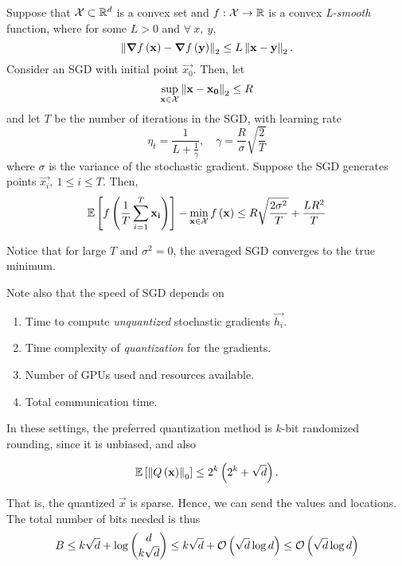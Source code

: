 \documentclass[twoside]{article}
\begin{document}
\begin{theorem}
    \label{thm:avg-sgd}
    Suppose that \(\mathcal X\subset\mathbb R^d\) is a convex set and \(f:\mathcal X\rightarrow\mathbb R\) is a 
    convex \emph{L-smooth} function, where for some \(L > 0\) and \(\forall\ x,\ y\),
    \begin{equation}
        \left\lVert\boldsymbol{\mathbf{\nabla}}f\left(\boldsymbol{\mathbf{x}}\right)-\boldsymbol{\mathbf{\nabla}}f\left(\boldsymbol{\mathbf{y}}\right)\right\rVert_2 \le L\left\lVert\boldsymbol{\mathbf{x}}-\boldsymbol{\mathbf{y}}\right\rVert_2.
        \label{eq:L-smooth}
    \end{equation}
    Consider an SGD with initial point \(\vec{x_0}\). Then, let
    \begin{equation}
        \sup_{\boldsymbol{\mathbf{x}}\in\mathcal X}\left\lVert\boldsymbol{\mathbf{x}}-\boldsymbol{\mathbf{x_0}}\right\rVert_2 \le R
    \end{equation}
    and let \(T\) be the number of iterations in the SGD, with learning rate
    \begin{equation}
        \eta_t = \frac{1}{L + \frac{1}{\gamma}},\quad \gamma = \frac{R}{\sigma}\sqrt{\frac{2}{T}}
    \end{equation}
    where \(\sigma\) is the variance of the stochastic gradient. Suppose the 
    SGD generates points \(\vec{x_i},\ 1 \le i \le T\). Then,
    \begin{equation}
        \mathbb{E}\left[ f\left(\frac{1}{T}\sum_{i=1}^T\boldsymbol{\mathbf{x_i}}\right) \right] - \min_{\boldsymbol{\mathbf{x}}\in\mathcal X}f\left(\boldsymbol{\mathbf{x}}\right) \le R\sqrt{\frac{2\sigma^2}{T}} + \frac{LR^2}{T}
    \end{equation}
\end{theorem}

Notice that for large \(T\) and \(\sigma^2 = 0\), the averaged SGD converges 
to the true minimum.

Note also that the speed of SGD depends on

\begin{enumerate}
    \item Time to compute \emph{unquantized} stochastic gradients \(\vec{h_i}\).
    \item Time complexity of \emph{quantization} for the gradients.
    \item Number of GPUs used and resources available.
    \item Total communication time.
\end{enumerate}

In these settings, the preferred quantization method is \(k\)-bit randomized
rounding, since it is unbiased, and also

\begin{equation}
    \mathbb{E}\left[ \left\lVert Q\left(\boldsymbol{\mathbf{x}}\right)\right\rVert_0 \right] \le 2^k\left(2^k + \sqrt{d}\right).
    \label{eq:rr-L0-bound}
\end{equation}

That is, the quantized \(\vec{x}\) is sparse. Hence, we can send the values and 
locations. The total number of bits needed is thus
\begin{equation}
    B \le k\sqrt{d} + \log\binom{d}{k\sqrt{d}} \le k\sqrt{d}+ \mathcal O\left(\sqrt{d}\log d\right) \le \mathcal O\left(\sqrt{d}\log d\right)
    \label{eq:num-bits-sparse}
\end{equation}
\end{document}
